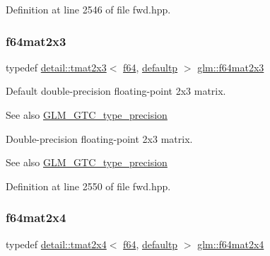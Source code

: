 Definition at line 2546 of file fwd.\+hpp.

\mbox{\label{group__gtc__type__precision_ga5b665390818b04bdd95bb6b2a25e5c2c}} 
\subsubsection{\texorpdfstring{f64mat2x3}{f64mat2x3}}
{\footnotesize\ttfamily typedef \hyperlink{structglm_1_1detail_1_1tmat2x3}{detail\+::tmat2x3}$<$ \hyperlink{group__gtc__type__precision_ga2bba392e555124b36cde6abba349bab3}{f64}, \hyperlink{namespaceglm_a0f04f086094c747d227af4425893f545a9d21ccd8b5a009ec7eb7677befc3bf51}{defaultp} $>$ \hyperlink{group__gtc__type__precision_ga5b665390818b04bdd95bb6b2a25e5c2c}{glm\+::f64mat2x3}}

Default double-\/precision floating-\/point 2x3 matrix. \begin{DoxySeeAlso}{See also}
\hyperlink{group__gtc__type__precision}{G\+L\+M\+\_\+\+G\+T\+C\+\_\+type\+\_\+precision}
\end{DoxySeeAlso}
Double-\/precision floating-\/point 2x3 matrix. \begin{DoxySeeAlso}{See also}
\hyperlink{group__gtc__type__precision}{G\+L\+M\+\_\+\+G\+T\+C\+\_\+type\+\_\+precision} 
\end{DoxySeeAlso}


Definition at line 2550 of file fwd.\+hpp.

\mbox{\label{group__gtc__type__precision_ga7f84d2c51081d56599a45c01d67ac155}} 
\subsubsection{\texorpdfstring{f64mat2x4}{f64mat2x4}}
{\footnotesize\ttfamily typedef \hyperlink{structglm_1_1detail_1_1tmat2x4}{detail\+::tmat2x4}$<$ \hyperlink{group__gtc__type__precision_ga2bba392e555124b36cde6abba349bab3}{f64}, \hyperlink{namespaceglm_a0f04f086094c747d227af4425893f545a9d21ccd8b5a009ec7eb7677befc3bf51}{defaultp} $>$ \hyperlink{group__gtc__type__precision_ga7f84d2c51081d56599a45c01d67ac155}{glm\+::f64mat2x4}}

